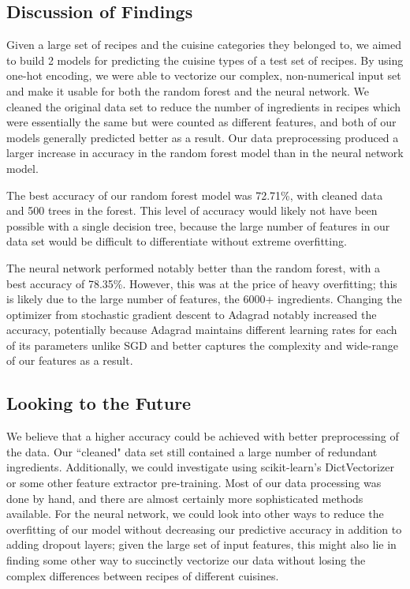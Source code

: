 \documentclass[11pt]{article}
\begin{document}
\subsection{Discussion of Findings}
Given a large set of recipes and the cuisine categories they belonged to, we aimed to build 2 models for predicting the cuisine types of a test set of recipes.
By using one-hot encoding, we were able to vectorize our complex, non-numerical input set and make it usable for both the random forest and the neural network. We cleaned
the original data set to reduce the number of ingredients in recipes which were essentially the same but were counted as different features, and both of our models generally
predicted better as a result. Our data preprocessing produced a larger increase in accuracy in the random forest model than in the neural network model.

The best accuracy of our random forest model was 72.71\%, with cleaned data and 500 trees in the forest. This level of accuracy would likely not have been possible with a single decision tree, because the large number of features in our data set would be difficult to differentiate without extreme overfitting.

The neural network performed notably better than the random forest, with a best accuracy of 78.35\%. However, this was at the price of heavy overfitting; this is likely
due to the large number of features, the 6000+ ingredients. Changing the optimizer from stochastic gradient descent to Adagrad notably increased the accuracy, potentially because
Adagrad maintains different learning rates for each of its parameters unlike SGD and better captures the complexity and wide-range of our features as a result.

\subsection{Looking to the Future}
We believe that a higher accuracy could be achieved with better preprocessing of the data. Our ``cleaned" data set still contained a large number of redundant ingredients. Additionally, we could investigate using scikit-learn's DictVectorizer or some other feature extractor pre-training. Most of our data processing was done by hand, and there are almost certainly more sophisticated methods available. For the neural network, we could look into other ways to reduce the overfitting of our model without decreasing our
predictive accuracy in addition to adding dropout layers; given the large set of input features, this might also lie in finding some other way to succinctly vectorize our
data without losing the complex differences between recipes of different cuisines.
\end{document}
